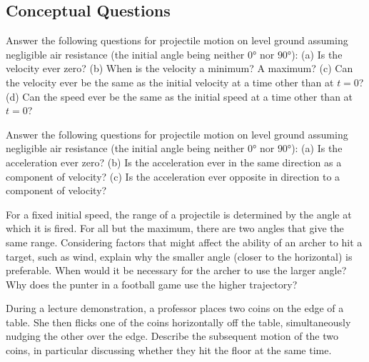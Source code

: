 \documentclass[
]{book}
\newenvironment{conceptual-questions}{}{}
\begin{document}
\hypertarget{fs-id2865659}{}
\begin{conceptual-questions}

\hypertarget{conceptual-questions-9}{%
\subsection{Conceptual Questions}\label{conceptual-questions-9}}

\hypertarget{fs-id2183300}{}
\leavevmode\hypertarget{fs-id2183302}{}%
Answer the following questions for projectile motion on level ground
assuming negligible air resistance (the initial angle being neither
\(\text{0°}{}\) nor \(\text{90°}{}\)): (a) Is the velocity ever zero? (b)
When is the velocity a minimum? A maximum? (c) Can the velocity ever be
the same as the initial velocity at a time other than at \({t = 0}{}\)?
(d) Can the speed ever be the same as the initial speed at a time other
than at \({t = 0}{}\)?

\hypertarget{fs-id1638420}{}
\leavevmode\hypertarget{fs-id1638423}{}%
Answer the following questions for projectile motion on level ground
assuming negligible air resistance (the initial angle being neither
\(\text{0°}{}\) nor \(\text{90°}{}\)): (a) Is the acceleration ever zero?
(b) Is the acceleration ever in the same direction as a component of
velocity? (c) Is the acceleration ever opposite in direction to a
component of velocity?

\hypertarget{fs-id2062475}{}
\leavevmode\hypertarget{fs-id2062477}{}%
For a fixed initial speed, the range of a projectile is determined by
the angle at which it is fired. For all but the maximum, there are two
angles that give the same range. Considering factors that might affect
the ability of an archer to hit a target, such as wind, explain why the
smaller angle (closer to the horizontal) is preferable. When would it be
necessary for the archer to use the larger angle? Why does the punter in
a football game use the higher trajectory?

\hypertarget{fs-id1875651}{}
\leavevmode\hypertarget{fs-id1875652}{}%
During a lecture demonstration, a professor places two coins on the edge
of a table. She then flicks one of the coins horizontally off the table,
simultaneously nudging the other over the edge. Describe the subsequent
motion of the two coins, in particular discussing whether they hit the
floor at the same time.

\end{conceptual-questions}
\end{document}
